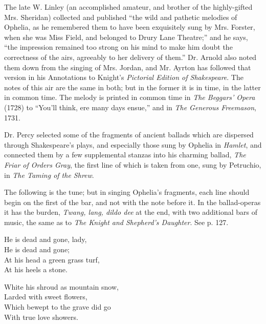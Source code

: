 The late W. Linley (an accomplished amateur, and brother of the highly-gifted
Mrs. Sheridan) collected and published “the wild and pathetic melodies of
Ophelia, as he remembered them to have been exquisitely sung by Mrs. Forster,
when she was Miss Field, and belonged to Drury Lane Theatre;” and he says,
“the impression remained too strong on his mind to make him doubt the
correctness of the airs, agreeably to her delivery of them.” Dr. Arnold also
noted them down from the singing of Mrs. Jordan, and Mr. Ayrton has followed
that version in his Annotations to Knight’s \textit{Pictorial Edition of Shakespeare}.
The notes of this air are the same in both; but in the former it is in  time,
in the latter in common time. The melody is printed in common time in
\textit{The Beggars’ Opera} (1728) to “You’ll think, ere many days ensue,” and in
\textit{The Generous Freemason}, 1731.

Dr. Percy selected some of the fragments of ancient ballads which are
dispersed through Shakespeare’s plays, and especially those sung by Ophelia in
\textit{Hamlet}, and connected them by a few supplemental stanzas into his charming
ballad, \textit{The Friar of Orders Gray}, the first line of which is taken from one, sung
by Petruchio, in \textit{The Taming of the Shrew}.

The following is the tune; but in singing Ophelia’s fragments, each line should
begin on the first of the bar, and not with the note before it. In the ballad-operas
it has the burden, \textit{Twang, lang, dildo dee} at the end, with two additional
bars of music, the same as to \textit{The Knight and Shepherd’s Daughter}. See p. 127.



\smallskip


\settowidth{\versewidth}{At his head a green grass turf,}
\begin{dcverse}\footnotesize
\begin{altverse}
He is dead and gone, lady,\\
He is dead and gone;\\
At his head a green grass turf,\\
At his heels a stone.
\end{altverse}

\begin{altverse}
White his shroud as mountain snow,\\
Larded with sweet flowers,\\
Which bewept to the grave did go\\
With true love showers.
\end{altverse}
\end{dcverse}
\pagebreak

